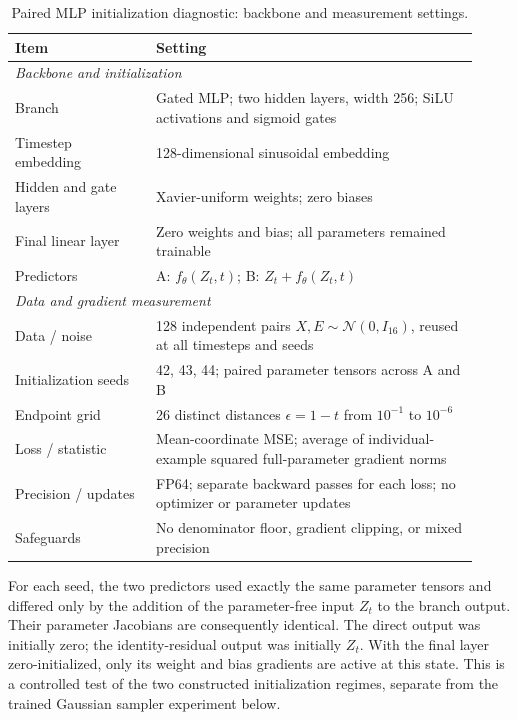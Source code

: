 \documentclass{article}
\theoremstyle{plain}
\theoremstyle{definition}
\theoremstyle{remark}
\begin{document}
\begin{table}[H]
\centering
\small
\caption{Paired MLP initialization diagnostic: backbone and measurement settings.}
\label{tab:initialization_settings}
\begin{tabular}{p{0.28\linewidth} p{0.64\linewidth}}
\toprule
\textbf{Item} & \textbf{Setting} \\
\midrule
\multicolumn{2}{l}{\textit{Backbone and initialization}} \\
Branch & Gated MLP; two hidden layers, width 256; SiLU activations and sigmoid gates \\
Timestep embedding & 128-dimensional sinusoidal embedding \\
Hidden and gate layers & Xavier-uniform weights; zero biases \\
Final linear layer & Zero weights and bias; all parameters remained trainable \\
Predictors & A: $f_\theta(Z_t,t)$; B: $Z_t+f_\theta(Z_t,t)$ \\
\midrule
\multicolumn{2}{l}{\textit{Data and gradient measurement}} \\
Data / noise & 128 independent pairs $X,E\sim\mathcal N(0,I_{16})$, reused at all timesteps and seeds \\
Initialization seeds & 42, 43, 44; paired parameter tensors across A and B \\
Endpoint grid & 26 distinct distances $\epsilon=1-t$ from $10^{-1}$ to $10^{-6}$ \\
Loss / statistic & Mean-coordinate MSE; average of individual-example squared full-parameter gradient norms \\
Precision / updates & FP64; separate backward passes for each loss; no optimizer or parameter updates \\
Safeguards & No denominator floor, gradient clipping, or mixed precision \\
\bottomrule
\end{tabular}
\end{table}

For each seed, the two predictors used exactly the same parameter tensors and differed only by the addition of the parameter-free input $Z_t$ to the branch output. Their parameter Jacobians are consequently identical. The direct output was initially zero; the identity-residual output was initially $Z_t$. With the final layer zero-initialized, only its weight and bias gradients are active at this state. This is a controlled test of the two constructed initialization regimes, separate from the trained Gaussian sampler experiment below.
\end{document}
